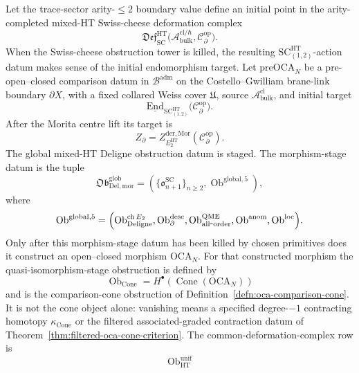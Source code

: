 \begin{defn}\label{defn:global-mixed-ht-deligne-obstruction-datum}
  Let the trace-sector arity-\(\le2\) boundary value define an initial
  point in the arity-completed mixed-HT Swiss-cheese deformation complex
  \[
    \mathfrak{Def}^{\mathrm{HT}}_{\mathrm{SC}}
    \bigl(\mathcal A^{\mathrm{cl}/\hbar}_{\mathrm{bulk}},
    \mathcal C^{\mathrm{op}}_\partial\bigr).
  \]
  When the Swiss-cheese obstruction tower is killed, the resulting
  \(\mathrm{SC}^{\mathrm{HT}}_{(1,2)}\)-action datum makes sense of the
  initial endomorphism target.  Let \(\mathrm{preOCA}_N\) be a
  pre-open--closed comparison datum in \(\mathcal B^{\mathrm{adm}}\) on
  the Costello--Gwilliam brane-link boundary \(\partial X\), with a
  fixed collared Weiss cover \(\mathfrak U\), source
  \(\mathcal A^{\mathrm{cl}}_{\mathrm{bulk}}\), and initial target
  \[
    \underline{\mathrm{End}}_{\mathrm{SC}^{\mathrm{HT}}_{(1,2)}}\!
    \bigl(\mathcal C^{\mathrm{op}}_\partial\bigr).
  \]
  After the Morita centre lift its target is
  \[
    Z_\partial=
    Z^{\mathrm{der},\mathrm{Mor}}_{E_2^{\mathrm{HT}}}
    (\mathcal C^{\mathrm{op}}_\partial).
  \]
  The global mixed-HT Deligne obstruction datum is staged.  The
  morphism-stage datum is the tuple
  \[
    \mathfrak{Ob}_{\mathrm{Del,mor}}^{\mathrm{glob}}
    =
    \left(
      \{\mathfrak o^{\mathrm{SC}}_{n+1}\}_{n\ge2},
      \operatorname{Ob}^{\mathrm{global},5}
    \right),
  \]
  where
  \[
    \operatorname{Ob}^{\mathrm{global},5}
    =
    \Bigl(
      \operatorname{Ob}^{\mathrm{ch}\,E_2}_{\mathrm{Deligne}},
      \operatorname{Ob}^{\mathrm{desc}}_{\partial},
      \operatorname{Ob}^{\mathrm{QME}}_{\mathrm{all\mbox{-}order}},
      \operatorname{Ob}^{\mathrm{anom}},
      \operatorname{Ob}^{\mathrm{loc}}
    \Bigr).
  \]
  Only after this morphism-stage datum has been killed by chosen
  primitives does it construct an open--closed morphism
  \(\mathrm{OCA}_N\).  For that constructed morphism the
  quasi-isomorphism-stage obstruction is defined by
  \[
    \operatorname{Ob}_{\operatorname{Cone}}
    =
    H^\bullet\!\left(\operatorname{Cone}(\mathrm{OCA}_N)\right)
  \]
  and is the comparison-cone obstruction of
  Definition~\ref{defn:oca-comparison-cone}.  It is not the cone object
  alone: vanishing means a specified degree-\(-1\) contracting homotopy
  \(\kappa_{\operatorname{Cone}}\) or the filtered associated-graded
  contraction datum of Theorem~\ref{thm:filtered-oca-cone-criterion}.
  The common-deformation-complex row is
  \[
    \operatorname{Ob}^{\mathrm{unif}}_{\mathrm{HT}}
\]
\end{defn}
